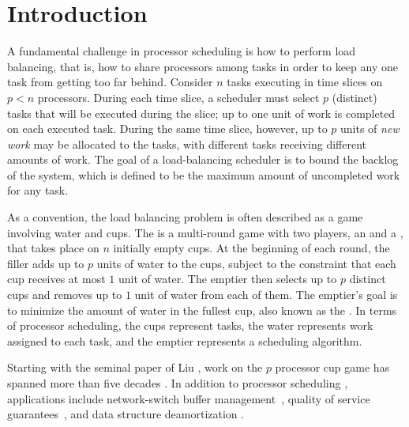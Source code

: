 \section{Introduction}\label{sec:intro}

A fundamental challenge in processor scheduling is how to perform
load balancing, that is, how to share processors among tasks in
order to keep any one task from getting too far behind. Consider
$n$ tasks executing in time slices on $p < n$ processors. During
each time slice, a scheduler must select $p$ (distinct) tasks
that will be executed during the slice; up to one unit of work is
completed on each executed task.
During the same time slice, however, up to $p$ units of \emph{new
work} may be allocated to the tasks, with different tasks
receiving different amounts of work. The goal of a load-balancing
scheduler is to bound the backlog of the system, which is defined
to be the maximum amount of uncompleted work for any task.

As a convention, the load balancing problem is often described as
a game involving water and cups. The  is a multi-round game with two players, an 
and a , that takes place on $n$ initially empty
cups. At the beginning of each round, the filler adds up to $p$
units of water to the cups, subject to the constraint that each
cup receives at most $1$ unit of water. The emptier then selects
up to $p$ distinct cups and removes up to $1$ unit of water from
each of them. The emptier's goal is to minimize the amount of
water in the fullest cup, also known as the . In
terms of processor scheduling, the cups represent tasks, the
water represents work assigned to each task, and the emptier
represents a scheduling algorithm.

Starting with the seminal paper of Liu \cite{Liu69}, work on the $p$ processor cup game has spanned more than five decades \cite{BaruahCoPl96,GkasieniecKl17,BaruahGe95,LitmanMo11,LitmanMo05,MoirRa99,BarNi02,GuanYi12,Liu69, LiuLa73,DietzRa91, BenderFaKu19, Kuszmaul20, AdlerBeFr03, DietzSl87, LitmanMo09}. In addition to processor scheduling \cite{BaruahCoPl96,GkasieniecKl17,BaruahGe95,LitmanMo11,LitmanMo05,MoirRa99,BarNi02,GuanYi12,Liu69, LiuLa73, AdlerBeFr03, LitmanMo09, DietzRa91}, applications include network-switch buffer management~\cite{Goldwasser10,AzarLi06,RosenblumGoTa04,Gail93}, quality of service guarantees~\cite{BaruahCoPl96,AdlerBeFr03,LitmanMo09}, and data structure deamortization \cite{AmirFaId95,DietzRa91,DietzSl87,AmirFr14,Mortensen03,GoodrichPa13,FischerGa15,Kopelowitz12,BenderDaFa20}.

